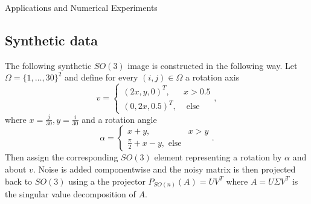 \begin{chapter}{Applications and Numerical Experiments}
\subsection{Synthetic data} %
\label{sub:Synthetic data}
The following synthetic $SO(3)$ image is constructed in the following way. Let $\Omega=\lbrace 1,\ldots,30 \rbrace^2$ and define for every $(i,j)\in\Omega$
a rotation axis
\begin{equation}
	v = \begin{cases}
	    (2x,y,0)^{T}, & x>0.5\\
	    (0,2x,0.5)^{T}, & \text{ else}
	\end{cases},
\end{equation}
where $x=\frac{j}{30}, y=\frac{i}{30}$ and a rotation angle
\begin{equation}
    \alpha = \begin{cases}
	   x + y, & x > y\\
	   \frac{\pi}{2} + x - y, \text{ else}
    \end{cases}.
\end{equation}
Then assign the corresponding $SO(3)$ element representing a rotation by $\alpha$ and about $v$. Noise is added componentwise and the noisy matrix is
then projected back to $SO(3)$ using a the projector $P_{SO(n)}(A)=UV^{T}$ where $A=U\Sigma V^T$ is the singular value decomposition of $A$.


\end{chapter}
